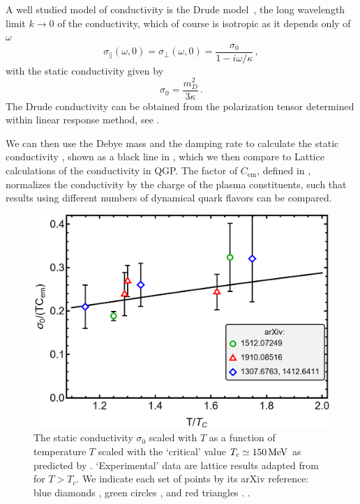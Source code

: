 A  well studied model of conductivity is the Drude model~\cite{Drude:1900}, the long wavelength limit $k \to 0$ of the conductivity, which of course is isotropic as it depends only of $\omega$
\begin{equation}\label{eq:drude}
    \sigma_\parallel(\omega,0) = \sigma_\perp(\omega,0) = \frac{\sigma_0}{1-i \omega/\kappa} \,,
\end{equation}
with the static conductivity given by
\begin{equation}\label{eq:condstat}
   \sigma_0 = \frac{m_D^2}{3\kappa}\,.
\end{equation} 
The Drude conductivity can be obtained from the polarization tensor  determined within linear response method, see .

We can then use the Debye mass  and the damping rate  to calculate the static conductivity , shown as a black line in , which we then compare to Lattice calculations of the conductivity in QGP.  The factor of $C_{\text{em}}$, defined in , normalizes the conductivity by the charge of the plasma constituents, such that results using different numbers of dynamical quark flavors can be compared.

\begin{figure}%
    \centering
    \includegraphics[width=0.85\linewidth]{plots/condcomp.png}
    \caption{The static conductivity $\sigma_0$ scaled with $T$ as a function of temperature $T$ scaled with the `critical' value $T_c\simeq 150\text{\,MeV}$ as predicted by . `Experimental' data are lattice results adapted from \cite{Aarts:2020dda} for $T>T_c$.  We indicate each set of points by its arXiv reference: blue diamonds \cite{Amato:2013naa,Aarts:2014nba}, green circles \cite{Brandt:2015aqk}, and red triangles \cite{Astrakhantsev:2019zkr}. .}
    \label{fig:lattice comp}
\end{figure}

